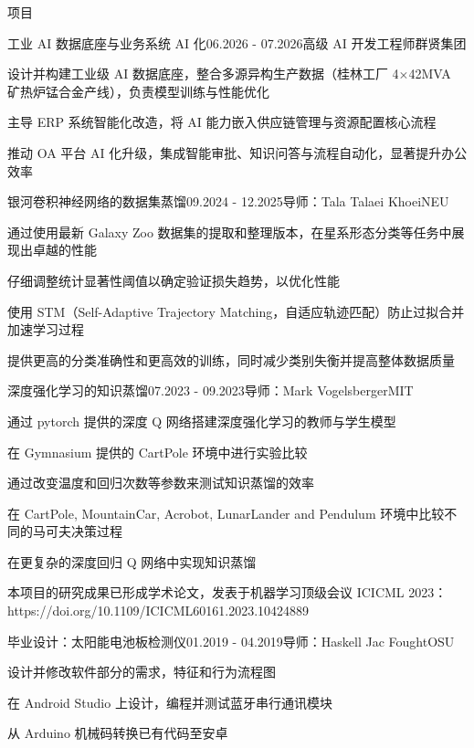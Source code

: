 \documentclass{resume} %
\begin{document}
\begin{rSection}{项目}

  \begin{rSubsection}{工业 AI 数据底座与业务系统 AI 化}{06.2026 - 07.2026}{高级 AI 开发工程师}{群贤集团}
    \item 设计并构建工业级 AI 数据底座，整合多源异构生产数据（桂林工厂 4$\times$42MVA 矿热炉锰合金产线），负责模型训练与性能优化
    \item 主导 ERP 系统智能化改造，将 AI 能力嵌入供应链管理与资源配置核心流程
    \item 推动 OA 平台 AI 化升级，集成智能审批、知识问答与流程自动化，显著提升办公效率
  \end{rSubsection}

  \begin{rSubsection}{银河卷积神经网络的数据集蒸馏}{09.2024 - 12.2025}{导师：Tala Talaei Khoei}{NEU}
    \item 通过使用最新 Galaxy Zoo 数据集的提取和整理版本，在星系形态分类等任务中展现出卓越的性能
    \item 仔细调整统计显著性阈值以确定验证损失趋势，以优化性能
    \item 使用 STM（Self-Adaptive Trajectory Matching，自适应轨迹匹配）防止过拟合并加速学习过程
    \item 提供更高的分类准确性和更高效的训练，同时减少类别失衡并提高整体数据质量
  \end{rSubsection}

  \begin{rSubsection}{深度强化学习的知识蒸馏}{07.2023 - 09.2023}{导师：Mark Vogelsberger}{MIT}
    \item 通过 pytorch 提供的深度 Q 网络搭建深度强化学习的教师与学生模型
    \item 在 Gymnasium 提供的 CartPole 环境中进行实验比较
    \item 通过改变温度和回归次数等参数来测试知识蒸馏的效率
    \item 在 CartPole, MountainCar, Acrobot, LunarLander and Pendulum 环境中比较不同的马可夫决策过程
    \item 在更复杂的深度回归 Q 网络中实现知识蒸馏
    \item 本项目的研究成果已形成学术论文，发表于机器学习顶级会议 ICICML 2023：\\https://doi.org/10.1109/ICICML60161.2023.10424889
  \end{rSubsection}

  \begin{rSubsection}{毕业设计：太阳能电池板检测仪}{01.2019 - 04.2019}{导师：Haskell Jac Fought}{OSU}
    \item 设计并修改软件部分的需求，特征和行为流程图
    \item 在 Android Studio 上设计，编程并测试蓝牙串行通讯模块
    \item 从 Arduino 机械码转换已有代码至安卓
  \end{rSubsection}


\end{rSection}
\end{document}
